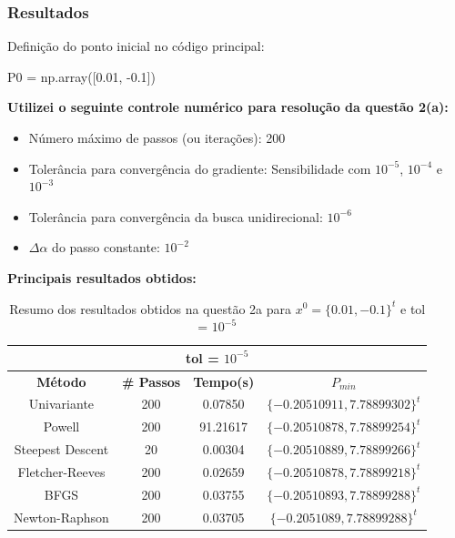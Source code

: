 \documentclass[10pt, a4paper]{article}
\begin{document}
\subsubsection{Resultados}

Definição do ponto inicial no código principal:
\begin{python}
  P0 = np.array([0.01, -0.1])
\end{python}

\textbf{Utilizei o seguinte controle numérico para resolução da questão 2(a):}
\begin{itemize}
  \item Número máximo de passos (ou iterações): 200
  \item Tolerância para convergência do gradiente: Sensibilidade com $10^{-5}$, $10^{-4}$ e $10^{-3}$
  \item Tolerância para convergência da busca unidirecional: $10^{-6}$
  \item $\Delta\alpha$ do passo constante: $10^{-2}$
\end{itemize}

\vspace{3mm}
\textbf{Principais resultados obtidos:}

\begin{table}[H]
  \begin{center}
    \begin{tabular}{c|c|c|c}
      \multicolumn{4}{c}{tol = $10^{-5}$}\\
      \hline
      \textbf{Método} & \textbf{\# Passos} & \textbf{Tempo(s)} & \textbf{$P_{min}$}\\
      \hline
      Univariante       & 200   & 0.07850 & $\{-0.20510911, 7.78899302\}^t$\\
      Powell            & 200   & 91.21617 & $\{-0.20510878, 7.78899254\}^t$\\
      Steepest Descent  & 20    & 0.00304 & $\{-0.20510889, 7.78899266\}^t$\\
      Fletcher-Reeves   & 200   & 0.02659 & $\{-0.20510878, 7.78899218\}^t$\\
      BFGS              & 200   & 0.03755 & $\{-0.20510893, 7.78899288\}^t$\\
      Newton-Raphson    & 200   & 0.03705 & $\{-0.2051089, 7.78899288\}^t$\\
    \end{tabular}
  \end{center}
  \caption{Resumo dos resultados obtidos na questão 2a para $x^0 = \{0.01,-0.1\}^t$ e tol = $10^{-5}$}
\end{table}
\end{document}
